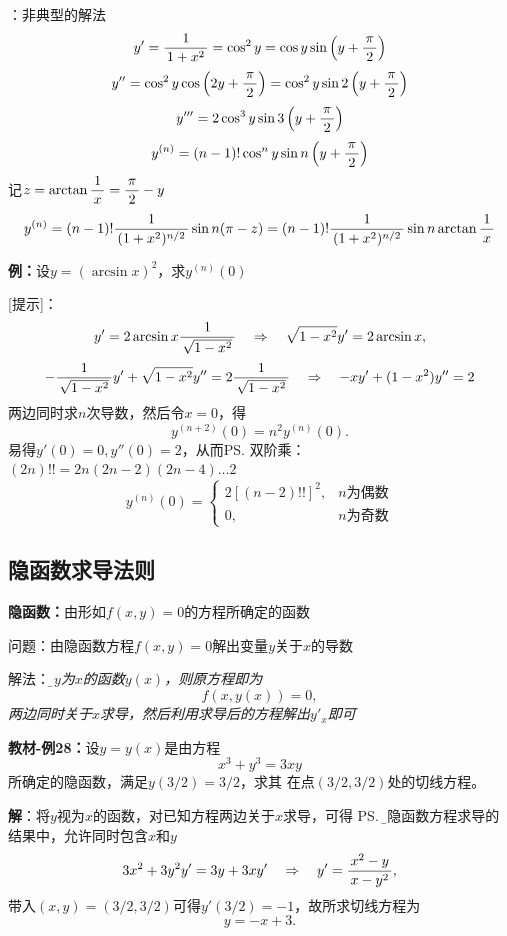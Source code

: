 \begin{shaded}
[提示]：非典型的解法
$$y'=\displaystyle\frac{\,{1}\,}{\,{1+x^2}\,}=\cos^2y=\cos y\sin\left(y+\displaystyle\frac{\,{\pi}\,}{\,{2}\,}\right)$$
$$y''=\cos^2y\cos\left(2y+\displaystyle\frac{\,{\pi}\,}{\,{2}\,}\right)=\cos^2y\sin2\left(y+\displaystyle\frac{\,{\pi}\,}{\,{2}\,}\right)$$
$$y'''=2\cos^3y\sin3\left(y+\displaystyle\frac{\,{\pi}\,}{\,{2}\,}\right)$$
$$y^{(n)}=(n-1)!\cos^ny\sin n\left(y+\displaystyle\frac{\,{\pi}\,}{\,{2}\,}\right)$$
记$z=\arctan\displaystyle\frac{\,{1}\,}{\,{x}\,}=\displaystyle\frac{\,{\pi}\,}{\,{2}\,}-y$
$$y^{(n)}=(n-1)!\displaystyle\frac{\,{1}\,}{\,{(1+x^2)^{n/2}}\,}\sin n(\pi-z)=
(n-1)!\displaystyle\frac{\,{1}\,}{\,{(1+x^2)^{n/2}}\,}\sin n\arctan\displaystyle\frac{\,{1}\,}{\,{x}\,}$$
\end{shaded}

{\bf 例：}设$y=(\arcsin x)^2$，求$y^{(n)}(0)$

[提示]：
$$y'=2\arcsin x\displaystyle\frac{\,{1}\,}{\,{\sqrt{1-x^2}}\,}\quad
\Rightarrow\quad \sqrt{1-x^2}y'=2\arcsin x,$$
$$-\displaystyle\frac{\,{1}\,}{\,{\sqrt{1-x^2}}\,}y'+\sqrt{1-x^2}y''=2\displaystyle\frac{\,{1}\,}{\,{\sqrt{1-x^2}}\,}\quad
\Rightarrow\quad-xy'+(1-x^2)y''=2$$
两边同时求$n$次导数，然后令$x=0$，得
$$y^{(n+2)}(0)=n^2y^{(n)}(0).$$
易得$y'(0)=0,y''(0)=2$，从而\ps{双阶乘：$(2n)!!=2n(2n-2)(2n-4)\ldots2$}
$$y^{(n)}(0)=\left\{\begin{array}{ll}
2[(n-2)!!]^2,& n\mbox{为偶数}\\
0,& n\mbox{为奇数}
\end{array}\right.$$

\subsection{隐函数求导法则}

{\bf 隐函数：}由形如$f(x,y)=0$的方程所确定的函数

问题：由隐函数方程$f(x,y)=0$解出变量$y$关于$x$的导数

解法：{\it\b 视$y$为$x$的函数$y(x)$，则原方程即为
$$f(x,y(x))=0,$$
两边同时关于$x$求导，然后利用求导后的方程解出$y'_x$即可
}

{\bf 教材-例28：}设$y=y(x)$是由方程
$$x^3+y^3=3xy$$
所确定的隐函数，满足$y(3/2)=3/2$，求其
在点$(3/2,3/2)$处的切线方程。

{\bf 解}：将$y$视为$x$的函数，对已知方程两边关于$x$求导，可得
\ps{\b 在隐函数方程求导的结果中，允许同时包含$x$和$y$}
$$3x^2+3y^2y'=3y+3xy'\quad\Rightarrow\quad
y'=\displaystyle\frac{\,{x^2-y}\,}{\,{x-y^2}\,},$$
带入$(x,y)=(3/2,3/2)$可得$y'(3/2)=-1$，故所求切线方程为
$$y=-x+3.$$

\begin{center}
\end{center}


